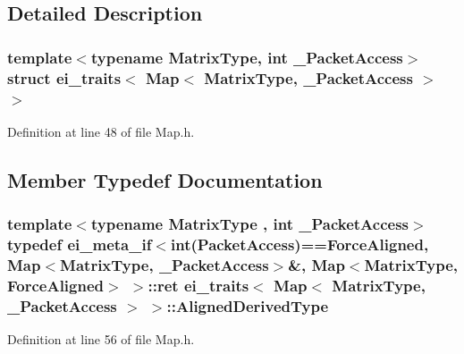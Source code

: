 \subsection{Detailed Description}
\subsubsection*{template$<$typename Matrix\-Type, int \-\_\-\-Packet\-Access$>$struct ei\-\_\-traits$<$ Map$<$ Matrix\-Type, \-\_\-\-Packet\-Access $>$ $>$}



Definition at line 48 of file Map.\-h.



\subsection{Member Typedef Documentation}
\hypertarget{structei__traits_3_01_map_3_01_matrix_type_00_01___packet_access_01_4_01_4_a026226ef5e2790d810a275ebeca62880}{
\subsubsection[{Aligned\-Derived\-Type}]{\setlength{\rightskip}{0pt plus 5cm}template$<$typename Matrix\-Type , int \-\_\-\-Packet\-Access$>$ typedef {\bf ei\-\_\-meta\-\_\-if}$<${\bf int}({\bf Packet\-Access})=={\bf Force\-Aligned}, {\bf Map}$<$Matrix\-Type, \-\_\-\-Packet\-Access$>$\&, {\bf Map}$<$Matrix\-Type, {\bf Force\-Aligned}$>$ $>$\-::{\bf ret} {\bf ei\-\_\-traits}$<$ {\bf Map}$<$ Matrix\-Type, \-\_\-\-Packet\-Access $>$ $>$\-::{\bf Aligned\-Derived\-Type}}}\label{structei__traits_3_01_map_3_01_matrix_type_00_01___packet_access_01_4_01_4_a026226ef5e2790d810a275ebeca62880}


Definition at line 56 of file Map.\-h.



